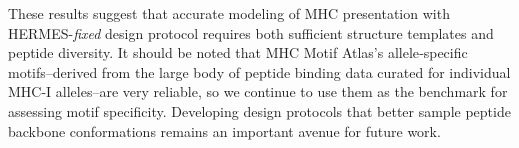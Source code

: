 These results suggest that accurate modeling of MHC presentation with HERMES-{\em fixed} design
protocol requires both sufficient structure templates and peptide diversity. It should be noted that
MHC Motif Atlas's allele‑specific motifs--derived from the large body of peptide binding data
curated for individual MHC-I alleles--are very reliable, so we continue to use them as the benchmark
for assessing motif specificity. Developing design protocols that better sample peptide backbone
conformations remains an important avenue for future work.

